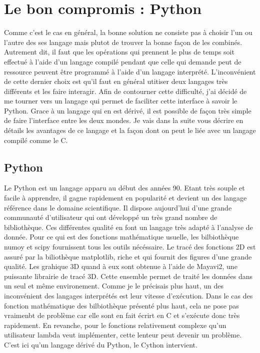 \section{Le bon compromis : Python}
Comme c'est le cas en général, la bonne solution ne consiste pas à choisir l'un ou l'autre des ses langage mais plutot de trouver la bonne façon de les combinés. Autrement dit, il faut que les opérations qui prennent le plus de temps soit effectué à l'aide d'un langage compilé pendant que celle qui demande peut de ressource peuvent être programmé à l'aide d'un langage interprété. L'inconvénient de cette dernier choix est qu'il faut en général utitiser deux langages très différents et les faire interagir. Afin de contourner cette difficulté, j'ai décidé de me tourner vers un langage qui permet de faciliter cette interface à savoir le Python. Grace à un langage qui en est dérivé, il est possible de façon très simple de faire l'interface entre les deux mondes. Je vais dans la suite vous décrire en détails les avantages de ce langage et la façon dont on peut le liée avec un langage compilé comme le C.

\subsection{Python}
Le Python est un langage apparu au début des années 90. Etant très souple et facile à apprendre, il gagne rapidement en popularité et devient un des langage référence dans le domaine scientifique. Il dispose aujourd'hui d'une grande communauté d'utilisateur qui ont développé un très grand nombre de bibliothèque. Ces différentes qualité en font un langage très adapté à l'analyse de donnée. Pour ce qui est des fonctions mathématique usuelle, les bilbiothèque numoy et scipy fournissent tous les outils nécéssaire. Le tracé des fonctions 2D est assuré par la biliothèque matplotlib, riche et qui fournit des figures d'une grande qualité. Les grahique 3D quand à eux sont obtenue à l'aide de Mayavi2, une puissante librairie de tracé 3D. Cette ensemble permet de traité les données dans un seul et même environement. Comme je le précisais plus haut, un des inconvénient des langages interprétés est leur vitesse d'exécution. Dans le cas des fonction mathématique des bilbiothèque présenté plus haut, cela ne pose pas vraimenbt de problème car elle sont en fait écrirt en C et s'exécute donc très rapidement. En revanche, pour le fonctions relativement complexe qu'un utilisateur lambda veut implémenter, cette lenteur peut devenir un problème. C'est ici qu'un langage dérivé du Python, le Cython intervient.

